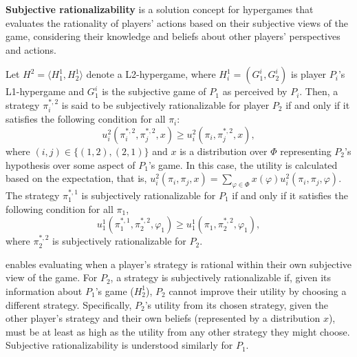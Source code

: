 \textbf{Subjective rationalizability} \citep{sasaki2014subjective} is a solution concept for hypergames that evaluates the rationality of players' actions based on their subjective views of the game, considering their knowledge and beliefs about other players' perspectives and actions.


\begin{definition} \label{def:sr}
    Let $H^2 = \langle H_1^1, H_2^1 \rangle$ denote a L2-hypergame, where $H_i^1 = (G_1^i, G_2^i)$ is player $P_i$'s L1-hypergame and $G_1^i$ is the subjective game of $P_1$ as perceived by $P_i$. 
    Then, a strategy $\pi_i^{\ast,2}$ is said to be subjectively rationalizable for player $P_2$ if and only if it satisfies the following condition for all $\pi_i$: 
    \[
	   u^2_i(\pi_i^{\ast,2},\pi^{\ast,2}_{j}, x) \ge u_i^2(\pi_i,\pi^{\ast,2}_{j}, x),
	\]
	where $(i,j)\in \{(1,2), (2,1)\}$
    and $x$ is a distribution over $\Phi$ representing $P_2$'s hypothesis over some aspect of $P_1$'s game.
    In this case, the utility is calculated based on the expectation, that is, $u_i^2(\pi_i,\pi_j,x) =\sum_{\varphi\in \Phi} x(\varphi) u_i^2(\pi_i,\pi_j,\varphi)$.
	The strategy $\pi_1^{\ast,1}$ is subjectively rationalizable for $P_1$ if and only if it satisfies the following condition for all $ \pi_1$,
	\[
	u_1^1(\pi_1^{\ast,1}, \pi_2^{\ast,2}, \varphi_1 ) \ge
	u_1^1(\pi_1, \pi_2^{\ast,2}, \varphi_1 ),
	\]
	where $\pi_2^{\ast,2}$ is subjectively rationalizable for $P_2$.
\end{definition}

 enables evaluating when a player's strategy is rational within their own subjective view of the game. 
For $P_2$, a strategy is subjectively rationalizable if, given its information about $P_1$'s game ($H_2^1$), $P_2$ cannot improve their utility by choosing a different strategy. 
Specifically, $P_2$'s utility from its chosen strategy, given the other player's strategy and their own beliefs (represented by a distribution $x$), must be at least as high as the utility from any other strategy they might choose. 
Subjective rationalizability is understood similarly for $P_1$.


